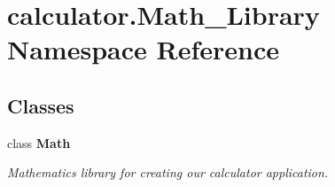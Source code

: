 \section{calculator.\+Math\+\_\+\+Library Namespace Reference}
\label{namespacecalculator_1_1_math___library}
\subsection*{Classes}
\begin{DoxyCompactItemize}
\item 
class \textbf{ Math}
\begin{DoxyCompactList}\small\item\em Mathematics library for creating our calculator application. \end{DoxyCompactList}\end{DoxyCompactItemize}

